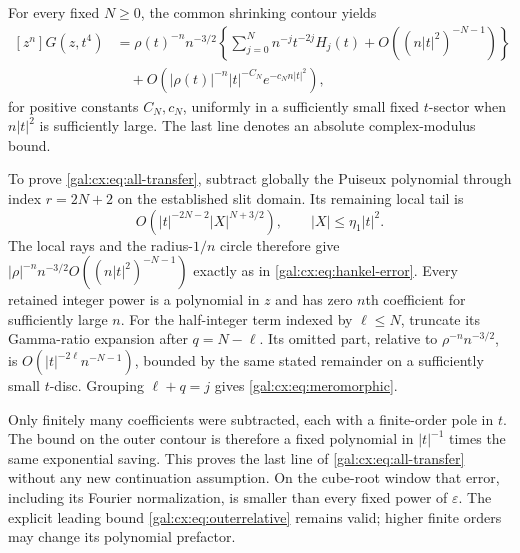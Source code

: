 \documentclass[11pt,letterpaper]{article}
\numberwithin{equation}{section}
\theoremstyle{definition}\newtheorem{definition}[theorem]{Definition}
\theoremstyle{remark}\newtheorem{remark}[theorem]{Remark}
\newcommand{\eps}{\varepsilon}
\begin{document}
For every fixed $N\ge0$, the common shrinking contour yields
\begin{equation}\label{gal:cx:eq:all-transfer}
\begin{aligned}
[z^n]G(z,t^4)
&=\rho(t)^{-n}n^{-3/2}
\left\{\sum_{j=0}^{N}n^{-j}t^{-2j}H_j(t)
+O((n|t|^2)^{-N-1})\right\}\\
&\quad+O\!\left(|\rho(t)|^{-n}|t|^{-C_N}
 e^{-c_Nn|t|^2}\right),
\end{aligned}
\end{equation}
for positive constants $C_N,c_N$, uniformly in a sufficiently small fixed $t$-sector when $n|t|^2$ is sufficiently large. The last line denotes an absolute complex-modulus bound.

To prove \eqref{gal:cx:eq:all-transfer}, subtract globally the Puiseux polynomial through index $r=2N+2$ on the established slit domain. Its remaining local tail is
\[
O\!\left(|t|^{-2N-2}|X|^{N+3/2}\right),
\qquad |X|\le\eta_1|t|^2.
\]
The local rays and the radius-$1/n$ circle therefore give
$|\rho|^{-n}n^{-3/2}O((n|t|^2)^{-N-1})$ exactly as in \eqref{gal:cx:eq:hankel-error}. Every retained integer power is a polynomial in $z$ and has zero $n$th coefficient for sufficiently large $n$. For the half-integer term indexed by $\ell\le N$, truncate its Gamma-ratio expansion after $q=N-\ell$. Its omitted part, relative to $\rho^{-n}n^{-3/2}$, is
$O(|t|^{-2\ell}n^{-N-1})$, bounded by the same stated remainder on a sufficiently small $t$-disc. Grouping $\ell+q=j$ gives \eqref{gal:cx:eq:meromorphic}.

Only finitely many coefficients were subtracted, each with a finite-order pole in $t$. The bound on the outer contour is therefore a fixed polynomial in $|t|^{-1}$ times the same exponential saving. This proves the last line of \eqref{gal:cx:eq:all-transfer} without any new continuation assumption. On the cube-root window that error, including its Fourier normalization, is smaller than every fixed power of $\eps$. The explicit leading bound \eqref{gal:cx:eq:outerrelative} remains valid; higher finite orders may change its polynomial prefactor.
\end{document}
